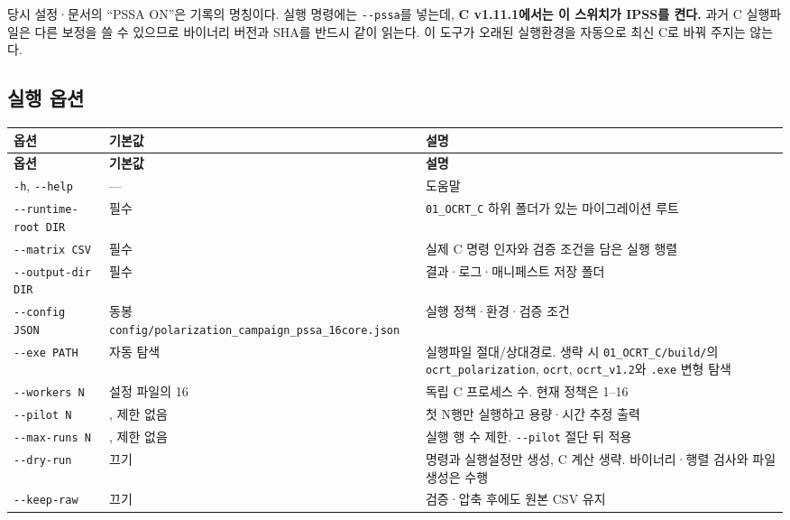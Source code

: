 당시 설정·문서의 “PSSA ON”은 기록의 명칭이다. 실행 명령에는 \texttt{-\allowbreak{}-\allowbreak{}pssa}를 넣는데, \textbf{C v1.11.1에서는 이 스위치가 IPSS를 켠다.} 과거 C 실행파일은 다른 보정을 쓸 수 있으므로 바이너리 버전과 SHA를 반드시 같이 읽는다. 이 도구가 오래된 실행환경을 자동으로 최신 C로 바꿔 주지는 않는다.

\subsection{실행 옵션}
\label{sec:auto:06_python_batch:10.1}

{\TableFont
\begin{longtable}{@{}>{\raggedright\arraybackslash}p{}>{\raggedright\arraybackslash}p{}>{\raggedright\arraybackslash}p{}@{}}
\toprule
\textbf{옵션} & \textbf{기본값} & \textbf{설명} \\
\midrule
\endfirsthead
\toprule
\textbf{옵션} & \textbf{기본값} & \textbf{설명} \\
\midrule
\endhead
\bottomrule
\endfoot
\texttt{-\allowbreak{}h}, \texttt{-\allowbreak{}-\allowbreak{}help} & --- & 도움말 \\
\texttt{-\allowbreak{}-\allowbreak{}runtime-\allowbreak{}root DIR} & 필수 & \texttt{01\_\allowbreak{}OCRT\_\allowbreak{}C} 하위 폴더가 있는 마이그레이션 루트 \\
\texttt{-\allowbreak{}-\allowbreak{}matrix CSV} & 필수 & 실제 C 명령 인자와 검증 조건을 담은 실행 행렬 \\
\texttt{-\allowbreak{}-\allowbreak{}output-\allowbreak{}dir DIR} & 필수 & 결과·로그·매니페스트 저장 폴더 \\
\texttt{-\allowbreak{}-\allowbreak{}config JSON} & 동봉 \texttt{config/\allowbreak{}polarization\_\allowbreak{}campaign\_\allowbreak{}pssa\_\allowbreak{}16core.\allowbreak{}json} & 실행 정책·환경·검증 조건 \\
\texttt{-\allowbreak{}-\allowbreak{}exe PATH} & 자동 탐색 & 실행파일 절대/상대경로. 생략 시 \texttt{01\_\allowbreak{}OCRT\_\allowbreak{}C/\allowbreak{}build/\allowbreak{}}의 \texttt{ocrt\_\allowbreak{}polarization}, \texttt{ocrt}, \texttt{ocrt\_\allowbreak{}v1.\allowbreak{}2}와 \texttt{.\allowbreak{}exe} 변형 탐색 \\
\texttt{-\allowbreak{}-\allowbreak{}workers N} & 설정 파일의 16 & 독립 C 프로세스 수. 현재 정책은 1--16 \\
\texttt{-\allowbreak{}-\allowbreak{}pilot N} & 0, 제한 없음 & 첫 N행만 실행하고 용량·시간 추정 출력 \\
\texttt{-\allowbreak{}-\allowbreak{}max-\allowbreak{}runs N} & 0, 제한 없음 & 실행 행 수 제한. \texttt{-\allowbreak{}-\allowbreak{}pilot} 절단 뒤 적용 \\
\texttt{-\allowbreak{}-\allowbreak{}dry-\allowbreak{}run} & 끄기 & 명령과 실행설정만 생성, C 계산 생략. 바이너리·행렬 검사와 파일 생성은 수행 \\
\texttt{-\allowbreak{}-\allowbreak{}keep-\allowbreak{}raw} & 끄기 & 검증·압축 후에도 원본 CSV 유지 \\
\end{longtable}
}

